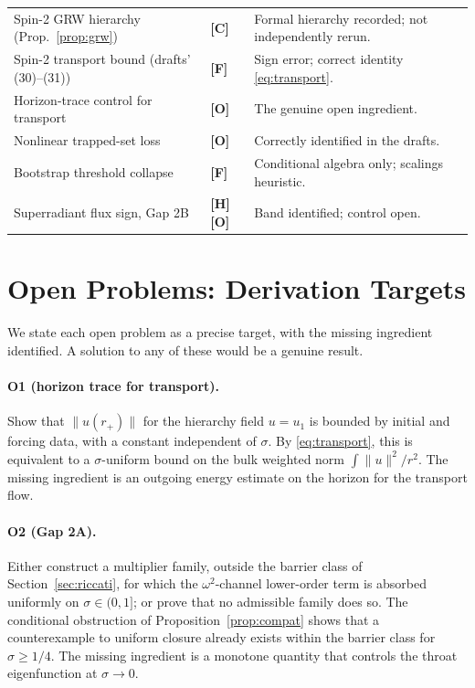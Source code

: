 \documentclass[11pt,a4paper]{article}
\newcommand{\VH}{\textcolor{vh}{\textbf{[H]}}}
\newcommand{\CC}{\textcolor{cc}{\textbf{[C]}}}
\newcommand{\FF}{\textcolor{ff}{\textbf{[F]}}}
\newcommand{\OO}{\textcolor{oo}{\textbf{[O]}}}
\theoremstyle{remark}
\theoremstyle{definition}
\begin{document}
\begin{table}[H]
\begin{tabular}{@{}p{5.0cm}p{2.2cm}p{7.6cm}@{}}
Spin-2 GRW hierarchy (Prop.~\ref{prop:grw}) & \CC & Formal hierarchy recorded; not independently rerun. \\
Spin-2 transport bound (drafts' (30)--(31)) & \FF & Sign error; correct identity \eqref{eq:transport}. \\
Horizon-trace control for transport & \OO & The genuine open ingredient. \\
Nonlinear trapped-set loss & \OO & Correctly identified in the drafts. \\
Bootstrap threshold collapse & \FF & Conditional algebra only; scalings heuristic. \\
Superradiant flux sign, Gap 2B & \VH\OO & Band identified; control open. \\
\bottomrule
\end{tabular}
\end{table}

\section{Open Problems: Derivation Targets}
\label{sec:open}

We state each open problem as a precise target, with the missing ingredient identified. A solution to any of these would be a genuine result.

\paragraph{O1 (horizon trace for transport).} Show that $\|u(r_+)\|$ for the hierarchy field $u = u_1$ is bounded by initial and forcing data, with a constant independent of $\sigma$. By \eqref{eq:transport}, this is equivalent to a $\sigma$-uniform bound on the bulk weighted norm $\int\|u\|^2/r^2$. The missing ingredient is an outgoing energy estimate on the horizon for the transport flow.

\paragraph{O2 (Gap 2A).} Either construct a multiplier family, outside the barrier class of Section~\ref{sec:riccati}, for which the $\omega^2$-channel lower-order term is absorbed uniformly on $\sigma\in(0,1]$; or prove that no admissible family does so. The conditional obstruction of Proposition~\ref{prop:compat} shows that a counterexample to uniform closure already exists within the barrier class for $\sigma\ge1/4$. The missing ingredient is a monotone quantity that controls the throat eigenfunction at $\sigma\to0$.
\end{document}
